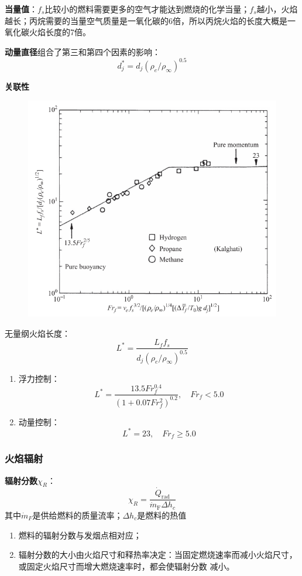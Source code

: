 \textbf{当量值}：\(f_s\)比较小的燃料需要更多的空气才能达到燃烧的化学当量；\(f_s\)越小，火焰越长；丙烷需要的当量空气质量是一氧化碳的6倍，所以丙烷火焰的长度大概是一氧化碳火焰长度的7倍。

\textbf{动量直径}组合了第三和第四个因素的影响：
\begin{equation}
    d_j^* = d_j(\rho_e/\rho_\infty)^{0.5}
\end{equation}

\textbf{关联性}
\begin{figure}[H]
    \includegraphics[width=.3\textwidth]{img/fr.png}
\end{figure}
无量纲火焰长度：
\begin{equation}
    L^* = \frac{L_f f_s}{d_j (\rho_e/\rho_\infty)^{0.5}}
\end{equation}

\begin{enumerate}
    \item 浮力控制：
    \begin{equation}
        L^* = \frac{13.5 Fr_f^{0.4}}{(1+0.07 Fr_f^2)^{0.2}}, \quad Fr_f < 5.0
    \end{equation}
    \item 动量控制：
    \begin{equation}
        L^* = 23, \quad Fr_f\ge 5.0
    \end{equation}
\end{enumerate}

\subsubsection{火焰辐射}
\textbf{辐射分数}\(\chi_R\)：
\begin{equation}
    \chi_R = \frac{\dot{Q}_\mathrm{rad}}{\dot{m}_\mathrm{F}\Delta h_c}
\end{equation}
其中\(\dot{m}_F\)是供给燃料的质量流率；\(\Delta h_c\)是燃料的热值

\begin{enumerate}
    \item 燃料的辐射分数与发烟点相对应；
    \item 辐射分数的大小由火焰尺寸和释热率决定：当固定燃烧速率而减小火焰尺寸，或固定火焰尺寸而增大燃烧速率时，都会使辐射分数 减小。    
\end{enumerate}

